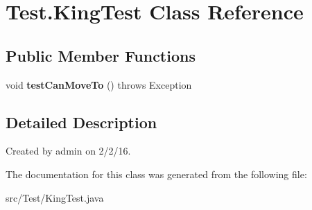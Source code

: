 \hypertarget{class_test_1_1_king_test}{}\section{Test.\+King\+Test Class Reference}
\label{class_test_1_1_king_test}
\subsection*{Public Member Functions}
\begin{DoxyCompactItemize}
\item 
void {\bfseries test\+Can\+Move\+To} ()  throws Exception \hypertarget{class_test_1_1_king_test_ada4e9cae00e238e4b5a67d7b7402f5a3}{}\label{class_test_1_1_king_test_ada4e9cae00e238e4b5a67d7b7402f5a3}

\end{DoxyCompactItemize}


\subsection{Detailed Description}
Created by admin on 2/2/16. 

The documentation for this class was generated from the following file\+:\begin{DoxyCompactItemize}
\item 
src/\+Test/King\+Test.\+java\end{DoxyCompactItemize}
